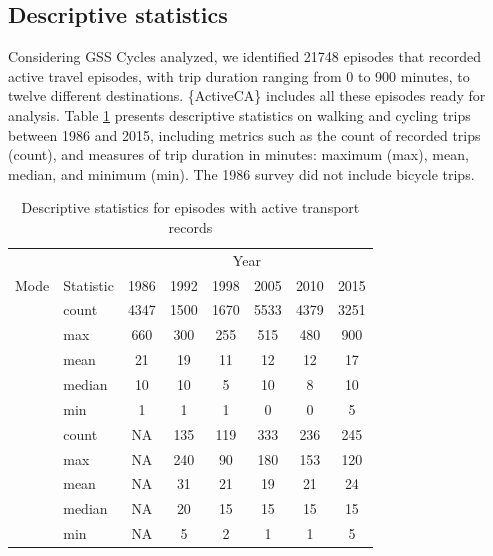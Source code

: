 \documentclass[Royal,times,sageh]{sagej}
\begin{document}
\subsection{Descriptive statistics}\label{descriptive-statistics}

Considering GSS Cycles analyzed, we identified 21748 episodes that
recorded active travel episodes, with trip duration ranging from 0 to
900 minutes, to twelve different destinations. \{ActiveCA\} includes all
these episodes ready for analysis. Table \ref{tab:table-01} presents
descriptive statistics on walking and cycling trips between 1986 and
2015, including metrics such as the count of recorded trips (count), and
measures of trip duration in minutes: maximum (max), mean, median, and
minimum (min). The 1986 survey did not include bicycle trips.

\begingroup\fontsize{10}{12}\selectfont

\begin{longtable}[t]{>{}llcccccc}
\caption{\label{tab:table-01}\label{tab:table-01}Descriptive statistics for episodes with active transport records}\\
\toprule
\multicolumn{2}{c}{ } & \multicolumn{6}{c}{Year} \\
\cmidrule(l{3pt}r{3pt}){3-8}
Mode & Statistic & 1986 & 1992 & 1998 & 2005 & 2010 & 2015\\
\midrule
 & count & 4347 & 1500 & 1670 & 5533 & 4379 & 3251\\
\nopagebreak
 & max & 660 & 300 & 255 & 515 & 480 & 900\\
\nopagebreak
 & mean & 21 & 19 & 11 & 12 & 12 & 17\\
\nopagebreak
 & median & 10 & 10 & 5 & 10 & 8 & 10\\
\nopagebreak
\multirow[t]{-5}{*}{\raggedright\arraybackslash \textbf{Walking}} & min & 1 & 1 & 1 & 0 & 0 & 5\\
\cmidrule{1-8}\pagebreak[0]
 & count & NA & 135 & 119 & 333 & 236 & 245\\
\nopagebreak
 & max & NA & 240 & 90 & 180 & 153 & 120\\
\nopagebreak
 & mean & NA & 31 & 21 & 19 & 21 & 24\\
\nopagebreak
 & median & NA & 20 & 15 & 15 & 15 & 15\\
\nopagebreak
\multirow[t]{-5}{*}{\raggedright\arraybackslash \textbf{Cycling}} & min & NA & 5 & 2 & 1 & 1 & 5\\
\bottomrule
\end{longtable}
\endgroup{}
\end{document}
